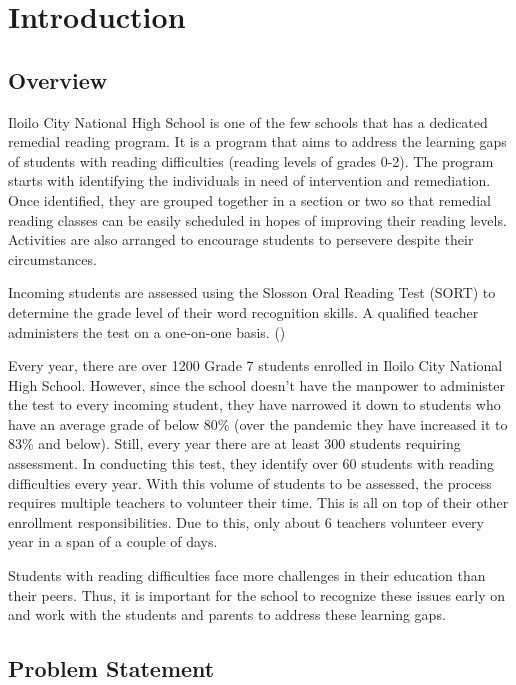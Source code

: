 \chapter{Introduction}
\label{sec:researchdesc}    %

\section{Overview}
\label{sec:overview}
Iloilo City National High School is one of the few schools that has a dedicated remedial reading program. It is a program that aims to address the learning gaps of students with reading difficulties (reading levels of grades 0-2). The program starts with identifying the individuals in need of intervention and remediation. Once identified, they are grouped together in a section or two so that remedial reading classes can be easily scheduled in hopes of improving their reading levels. Activities are also arranged to encourage students to persevere despite their circumstances.

Incoming students are assessed using the Slosson Oral Reading Test (SORT) to determine the grade level of their word recognition skills. A qualified teacher administers the test on a one-on-one basis. (\citeauthor{SORT_web})

Every year, there are over 1200 Grade 7 students enrolled in Iloilo City National High School. However, since the school doesn’t have the manpower to administer the test to every incoming student, they have narrowed it down to students who have an average grade of below 80\% (over the pandemic they have increased it to 83\% and below). Still, every year there are at least 300 students requiring assessment. In conducting this test, they identify over 60 students with reading difficulties every year. With this volume of students to be assessed, the process requires multiple teachers to volunteer their time. This is all on top of their other enrollment responsibilities. Due to this, only about 6 teachers volunteer every year in a span of a couple of days.

Students with reading difficulties face more challenges in their education than their peers. Thus, it is important for the school to recognize these issues early on and work with the students and parents to address these learning gaps.

\section{Problem Statement}
\label{sec:problemstatement}

